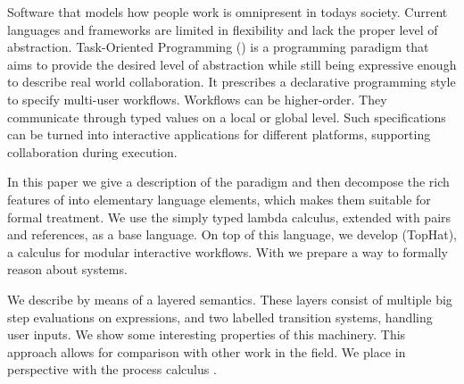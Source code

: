 
Software that models how people work is omnipresent in todays society.
Current languages and frameworks are limited in flexibility and lack the proper level of abstraction.
Task-Oriented Programming (\TOP) is a programming paradigm that aims to provide the desired level of abstraction while still being expressive enough to describe real world collaboration.
It prescribes a declarative programming style to specify multi-user workflows.
Workflows can be higher-order.
They communicate through typed values on a local or global level.
Such specifications can be turned into interactive applications for different platforms,
supporting collaboration during execution.

In this paper we give a description of the \TOP paradigm and then decompose the rich features of \TOP into elementary language elements,
which makes them suitable for formal treatment.
We use the simply typed lambda calculus, extended with pairs and references, as a base language.
On top of this language, we develop \TOPHAT (TopHat), a calculus for modular interactive workflows.
With \TOPHAT we prepare a way to formally reason about \TOP systems.

We describe \TOPHAT by means of a layered semantics.
These layers consist of multiple big step evaluations on expressions,
and two labelled transition systems, handling user inputs.
We show some interesting properties of this machinery.
This approach allows for comparison with other work in the field.
We place \TOPHAT in perspective with the process calculus \CSP.




